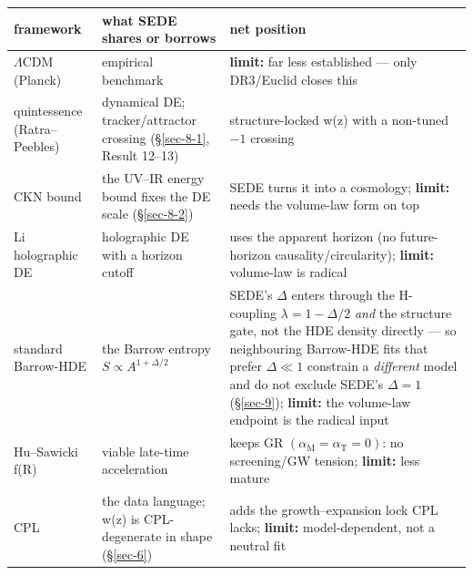 \documentclass[preprint,12pt]{elsarticle}
\begin{document}
\begin{longtable}[]{@{}
  >{\raggedright\arraybackslash}p{}
  >{\raggedright\arraybackslash}p{}
  >{\raggedright\arraybackslash}p{}@{}}
\toprule\noalign{}
\begin{minipage}[b]{\linewidth}\raggedright
framework
\end{minipage} & \begin{minipage}[b]{\linewidth}\raggedright
what SEDE shares or borrows
\end{minipage} & \begin{minipage}[b]{\linewidth}\raggedright
net position
\end{minipage} \\
\midrule\noalign{}
\endhead
\bottomrule\noalign{}
\endlastfoot
\(\Lambda \mathrm{CDM}\) (Planck) & empirical benchmark &
\textbf{limit:} far less established --- only DR3/Euclid closes this \\
quintessence (Ratra--Peebles) & dynamical DE; tracker/attractor crossing
(§\ref{sec-8-1}, Result 12--13) & structure-locked w(z) with a non-tuned
\(-1\) crossing \\
CKN bound & the UV--IR energy bound fixes the DE scale (§\ref{sec-8-2})
& SEDE turns it into a cosmology; \textbf{limit:} needs the volume-law
form on top \\
Li holographic DE & holographic DE with a horizon cutoff & uses the
apparent horizon (no future-horizon causality/circularity);
\textbf{limit:} volume-law is radical \\
standard Barrow-HDE \citep{Saridakis:2020zol} & the Barrow entropy
\(S \propto  A^{1+\Delta /2}\) & SEDE's \(\Delta\) enters through the
H-coupling \(\lambda  = 1-\Delta /2\) \emph{and} the structure gate, not
the HDE density directly --- so neighbouring Barrow-HDE fits that prefer
\(\Delta  \ll  1\) \citep{Luciano:2025elo} constrain a \emph{different}
model and do not exclude SEDE's \(\Delta  = 1\) (§\ref{sec-9});
\textbf{limit:} the volume-law endpoint is the radical input \\
Hu--Sawicki f(R) & viable late-time acceleration & keeps GR
\((\alpha _{\mathrm{M}} = \alpha _{\mathrm{T}} = 0)\): no screening/GW
tension; \textbf{limit:} less mature \\
CPL & the data language; w(z) is CPL-degenerate in shape (§\ref{sec-6})
& adds the growth--expansion lock CPL lacks; \textbf{limit:}
model-dependent, not a neutral fit \\

\end{longtable}
\end{document}
